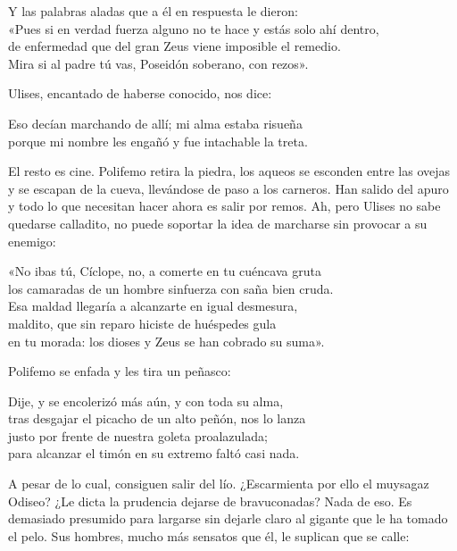 \begin{versocita}
Y las palabras aladas que a él en respuesta le dieron:\\
«Pues si en verdad fuerza alguno no te hace y estás solo ahí dentro,\\
de enfermedad que del gran Zeus viene imposible el remedio.\\
Mira si al padre tú vas, Poseidón soberano, con rezos».
\end{versocita}

Ulises, encantado de haberse conocido, nos dice:

\begin{versocita}
Eso decían marchando de allí; mi alma estaba risueña\\
porque mi nombre les engañó y fue intachable la treta.
\end{versocita}

El resto es cine. Polifemo retira la piedra, los aqueos se esconden entre las ovejas y se escapan de la cueva, llevándose de paso a los carneros. Han salido del apuro y todo lo que necesitan hacer ahora es salir por remos. Ah, pero Ulises no sabe quedarse calladito, no puede soportar la idea de marcharse sin provocar a su enemigo:

\begin{versocita}
«No ibas tú, Cíclope, no, a comerte en tu cuéncava gruta\\
los camaradas de un hombre sinfuerza con saña bien cruda.\\
Esa maldad llegaría a alcanzarte en igual desmesura,\\
maldito, que sin reparo hiciste de huéspedes gula\\
en tu morada: los dioses y Zeus se han cobrado su suma».
\end{versocita}

Polifemo se enfada y les tira un peñasco:

\begin{versocita}
Dije, y se encolerizó más aún, y con toda su alma,\\
tras desgajar el picacho de un alto peñón, nos lo lanza\\
justo por frente de nuestra goleta proalazulada;\\
para alcanzar el timón en su extremo faltó casi nada.
\end{versocita}

A pesar de lo cual, consiguen salir del lío. ¿Escarmienta por ello el muysagaz Odiseo? ¿Le dicta la prudencia dejarse de bravuconadas? Nada de eso. Es demasiado presumido para largarse sin dejarle claro al gigante que le ha tomado el pelo.
Sus hombres, mucho más sensatos que él, le suplican que se calle:

